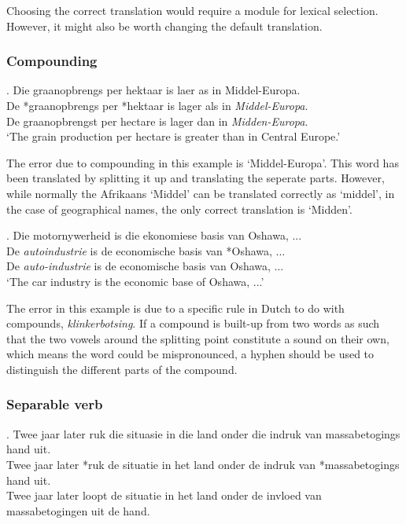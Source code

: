 \documentclass[11pt]{article}
\begin{document}
Choosing the correct translation would require a module for lexical selection. However, it might also
be worth changing the default translation.

\subsubsection{Compounding}

\ex. \label{ex:excompsplit} 
    Die graanopbrengs per hektaar is laer as in Middel-Europa. \\
    De *graanopbrengs per *hektaar is lager als in {\em Middel-Europa}. \\
    De graanopbrengst per hectare is lager dan in {\em Midden-Europa}. \\
   `The grain production per hectare is greater than in Central Europe.'

The error due to compounding in this example is `Middel-Europa'. This word has been translated by splitting it up and translating the seperate parts.
 However, while normally the Afrikaans `Middel' can be translated correctly as `middel', in the case of geographical names, the only correct translation is `Midden'.

\ex. \label{ex:excomphyphen} 
    Die motornywerheid is die ekonomiese basis van Oshawa, ...  \\
    De {\em autoindustrie} is de economische basis van *Oshawa, ... \\
    De {\em auto-industrie} is de economische basis van Oshawa, ... \\
   `The car industry is the economic base of Oshawa, ...'

The error in this example is due to a specific rule in Dutch to do with 
compounds, \emph{klinkerbotsing}. If a compound is built-up from two words as such 
that the two vowels around the splitting point constitute a sound on their own, 
which means the word could be mispronounced, a hyphen should be used to distinguish 
the different parts of the compound. 

\subsubsection{Separable verb}

\ex. \label{ex:exsepverb} 
    Twee jaar later ruk die situasie in die land onder die indruk van massabetogings hand uit. \\
    Twee jaar later *ruk de situatie in het land onder de indruk van *massabetogings hand uit. \\
    Twee jaar later loopt de situatie in het land onder de invloed van massabetogingen uit de hand. \\
\end{document}
